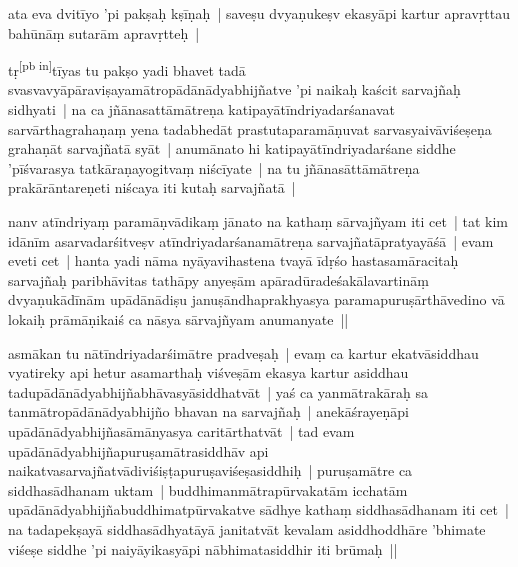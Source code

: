 \documentclass[article,a4paper]{memoir}
\begin{document}
	

	  \pstart ata eva dvitī\-yo 'pi pakṣaḥ kṣī\-ṇaḥ | saveṣu dvyaṇukeṣv ekasyā\-pi kartur apravṛttau bahū\-nā\-ṃ sutarā\-m apravṛtteḥ |
	\pend
      

	  \pstart tṛ\leavevmode\textsuperscript{\rmlatinfont\tiny [pb in]}\label{RNAms_32a}tī\-yas tu pakṣo yadi bhavet tadā\- svasvavyā\-pā\-raviṣayamā\-tropā\-dā\-nā\-dyabhijñatve 'pi naikaḥ kaścit sarvajñaḥ sidhyati | na ca \label{rnā__151710}jñā\-nasattā\-mā\-treṇa\label{rnā__151759} katipayā\-tī\-ndriyadarśanavat sarvā\-rthagrahaṇaṃ yena tadabhedā\-t prastutaparamā\-ṇuvat sarvasyaivā\-viśeṣeṇa grahaṇā\-t sarvajñatā\- syā\-t | anumā\-nato hi katipayā\-tī\-ndriyadarśane siddhe 'pī\-śvarasya tatkā\-raṇayogitvaṃ niścī\-yate | na tu jñā\-nasā\-ttā\-mā\-treṇa prakā\-rā\-ntareṇeti niścaya iti kutaḥ sarvajñatā\- |
	\pend
      

	  \pstart nanv atī\-ndriyaṃ paramā\-ṇvā\-dikaṃ jā\-nato na kathaṃ sā\-rvajñyam iti cet | tat kim idā\-nī\-m asarvadarśitveṣv atī\-ndriyadarśanamā\-treṇa sarvajñatā\-pratyayā\-śā\- | evam eveti cet | hanta yadi nā\-ma nyā\-yavihastena tvayā\- ī\-dṛśo hastasamā\-racitaḥ sarvajñaḥ paribhā\-vitas tathā\-py anyeṣā\-m apā\-radū\-radeśakā\-lavartinā\-ṃ dvyaṇukā\-dī\-nā\-m upā\-dā\-nā\-diṣu januṣā\-ndhaprakhyasya paramapuruṣā\-rthā\-vedino vā\- lokaiḥ prā\-mā\-ṇikaiś ca nā\-sya sā\-rvajñyam anumanyate ||
	\pend
      

	  \pstart asmā\-kan tu nā\-tī\-ndriyadarśimā\-tre pradveṣaḥ | evaṃ ca kartur ekatvā\-siddhau vyatireky api hetur asamarthaḥ viśveṣā\-m ekasya kartur asiddhau tadupā\-dā\-nā\-dyabhijñabhā\-vasyā\-siddhatvā\-t | yaś ca yanmā\-trakā\-raḥ sa tanmā\-tropā\-dā\-nā\-dyabhijño bhavan na sarvajñaḥ | anekā\-śrayeṇā\-pi upā\-dā\-nā\-dyabhijñasā\-mā\-nyasya caritā\-rthatvā\-t | tad evam upā\-dā\-nā\-dyabhijñapuruṣamā\-trasiddhā\-v api naikatvasarvajñatvā\-diviśiṣṭapuruṣaviśeṣasiddhiḥ | puruṣamā\-tre ca siddhasā\-dhanam uktam | buddhimanmā\-trapū\-rvakatā\-m icchatā\-m upā\-dā\-nā\-dyabhijñabuddhimatpū\-rvakatve sā\-dhye kathaṃ \label{ratnakīrtinibandhāvali__36r1NMNKPK8I8K079OIC2E8BVU5}siddhasā\-dhanam\label{ratnakīrtinibandhāvali__36r1NMNKPKAMZXOQ29O4V14D9F6} iti cet | na tadapekṣayā\- siddhasā\-dhyatā\-yā\- janitatvā\-t kevalam asiddhoddhā\-re 'bhimate viśeṣe siddhe 'pi naiyā\-yikasyā\-pi nā\-bhimatasiddhir iti brū\-maḥ ||
	\pend
      
\end{document}
